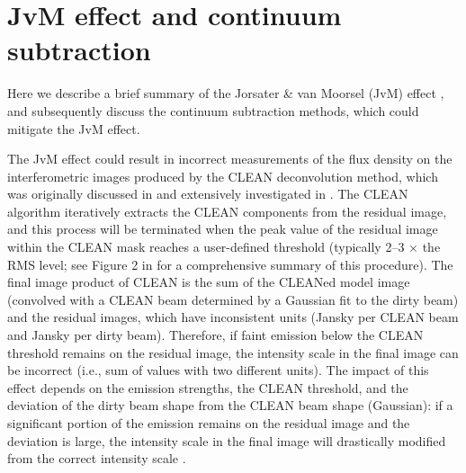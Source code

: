 \documentclass[twocolumn, twocolappendix, astrosymb, times]{aastex631}
\newcommand{\acetaldehyde}{CH$_3$CHO\xspace}
\newcommand{\methylformate}{CH$_3$OCHO\xspace}
\begin{document}
\begin{figure*}
\caption{Same as Figure \ref{fig:channelmap_CH3OH}, but for \acetaldehyde $5_{2,3}$ -- $4_{2,2}$ E $v_t=0$ transition.}
\label{fig:channelmap_CH3CHO}
\end{figure*}

\begin{figure*}
\caption{Same as Figure \ref{fig:channelmap_CH3OH}, but for \methylformate $8_{5,3}$ -- $7_{5,2}$ A $v_t=0$ transition.}
\label{fig:channelmap_CH3OCHO}
\end{figure*}



\section{JvM effect and continuum subtraction}\label{appendix:JvM_effect}
Here we describe a brief summary of the Jorsater \& van Moorsel (JvM) effect \citep{JvM, Czekala2021}, and subsequently discuss the continuum subtraction methods, which could mitigate the JvM effect.

The JvM effect could result in incorrect measurements of the flux density on the interferometric images produced by the CLEAN deconvolution method, which was originally discussed in \citet{JvM} and extensively investigated in \citet{Czekala2021}. The CLEAN algorithm iteratively extracts the CLEAN components from the residual image, and this process will be terminated when the peak value of the residual image within the CLEAN mask reaches a user-defined threshold (typically 2--3 $\times$ the RMS level; see Figure 2 in \citet{Czekala2021} for a comprehensive summary of this procedure). The final image product of CLEAN is the sum of the CLEANed model image (convolved with a CLEAN beam determined by a Gaussian fit to the dirty beam) and the residual images, which have inconsistent units (Jansky per CLEAN beam and Jansky per dirty beam). Therefore, if faint emission below the CLEAN threshold remains on the residual image, the intensity scale in the final image can be incorrect (i.e., sum of values with two different units). The impact of this effect depends on the emission strengths, the CLEAN threshold, and the deviation of the dirty beam shape from the CLEAN beam shape (Gaussian): if a significant portion of the emission remains on the residual image and the deviation is large, the intensity scale in the final image will drastically modified from the correct intensity scale \citep{JvM, Czekala2021}.  
\end{document}
